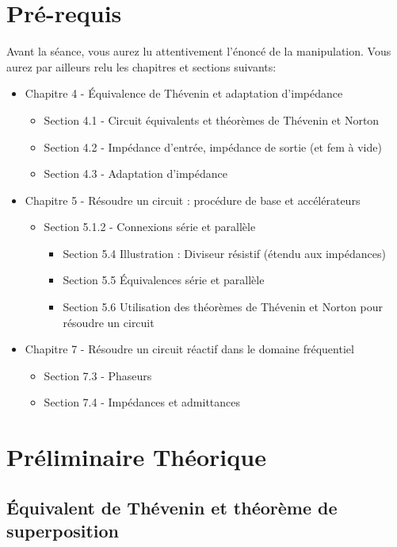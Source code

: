 \section{Pré-requis}
Avant la séance, vous aurez lu attentivement l'énoncé de la manipulation. Vous aurez par ailleurs relu les chapitres et sections suivants:
\begin{itemize}
	\item Chapitre 4 - Équivalence de Thévenin et adaptation d'impédance
		\begin{itemize}
		\item Section 4.1 - Circuit équivalents et théorèmes de Thévenin et Norton
		\item Section 4.2 - Impédance d'entrée, impédance de sortie (et fem à vide)
		\item Section 4.3 - Adaptation d'impédance
		\end{itemize}
	\item Chapitre 5 - Résoudre un circuit : procédure de base et accélérateurs
		\begin{itemize}
		\item Section 5.1.2 - Connexions série et parallèle
			\begin{itemize}
			\item Section 5.4 Illustration : Diviseur résistif (étendu aux impédances) 
			\item Section 5.5 Équivalences série et parallèle
			\item Section 5.6 Utilisation des théorèmes de Thévenin et Norton pour résoudre un circuit
			\end{itemize}
		\end{itemize}
	\item Chapitre 7 - Résoudre un circuit réactif dans le domaine fréquentiel
		\begin{itemize}
		\item Section 7.3 - Phaseurs
		\item Section 7.4 - Impédances et admittances
		\end{itemize}
\end{itemize}

\vspace{5pt}

\newpage

\section{Préliminaire Théorique}
\subsection{Équivalent de Thévenin et théorème de superposition}

